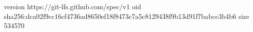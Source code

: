 version https://git-lfs.github.com/spec/v1
oid sha256:dca02f9cc16cf4736ad8650ef18f8473c7a5c8129438f9b13d91f7babcc3b4b6
size 534570
